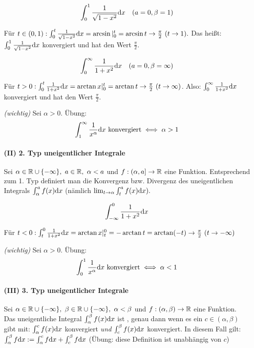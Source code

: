 \documentclass[a4paper,oneside,DIV15,BCOR12mm]{scrbook}
\begin{document}
\begin{beispiele}
\item $$\int_0^1 \frac{1}{\sqrt{1-x^2}}\text{d}x\quad(a=0,\beta=1)$$

Für $t \in (0,1): \int_0^t \frac{1}{\sqrt{1-x^2}}\dx = \arcsin|_0^t = \arcsin t \to \frac{\pi}{2}\ (t \to 1).$ Das heißt: $\int_0^1 \frac{1}{\sqrt{1-x^2}}\text{d}x$ konvergiert und hat den Wert $\frac{\pi}{2}$.

\item $$\int_0^\infty \frac{1}{1+x^2}\text{d}x\quad(a=0,\beta=\infty)$$

Für $t>0: \int_0^t \frac{1}{1+x^2}\text{d}x = \arctan x|_0^t = \arctan t \to \frac{\pi}{2}\ (t \to \infty)$. Also: $\int_0^\infty \frac{1}{1+x^2}\text{d}x$ konvergiert und hat den Wert $\frac{\pi}{2}$.

\item \textit{(wichtig)} Sei $\alpha > 0$. Übung: $$\int_1^\infty \frac{1}{x^\alpha}\text{d}x\text{ konvergiert} \iff \alpha > 1$$
\end{beispiele}

\paragraph{(II) 2. Typ uneigentlicher Integrale}
Sei $\alpha \in \mathbb{R} \cup \{-\infty\},\ a \in \mathbb{R},\ \alpha < a$ und $f:(\alpha,a] \to \mathbb{R}$ eine Funktion. Entsprechend zum 1. Typ definiert man die Konvergenz bzw. Divergenz des uneigentlichen Integrals $\int_\alpha^a f(x) \text{d}x$ (nämlich $\lim_{t\to\alpha} \int_t^a f(x)\text{d}x).$

\begin{beispiele}
\item $$\int_{-\infty}^0 \frac{1}{1+x^2}\text{d}x$$

Für $t<0: \int_t^0 \frac{1}{1+x^2}\text{d}x = \arctan x|_t^0 = -\arctan t = \arctan (-t) \to \frac{\pi}{2}\ (t \to -\infty)$

\item \textit{(wichtig)} Sei $\alpha > 0.$ Übung: $$\int_0^1 \frac{1}{x^\alpha}\text{d}x\text{ konvergiert} \iff \alpha < 1$$
\end{beispiele}

\paragraph{(III) 3. Typ uneigentlicher Integrale}
Sei $\alpha \in \MdR \cup \{-\infty\},\ \beta \in \MdR \cup \{-\infty\},\ \alpha < \beta$ und $f:(\alpha,\beta) \to \mathbb{R}$ eine Funktion. Das uneigentliche Integral $\int_\alpha^\beta f(x)\text{d}x$ ist , genau dann wenn es ein $c \in (\alpha,\beta)$ gibt mit: $\int_\alpha^c f(x)\text{d}x$ konvergiert \emph{und} $\int_c^\beta f(x)\text{d}x$ konvergiert. In diesem Fall gilt: $\int_\alpha^\beta f\text{d}x := \int_\alpha^c f\text{d}x + \int_c^\beta f\text{d}x$ (Übung: diese Definition ist unabhängig von $c$)
\end{document}
